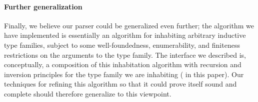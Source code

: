   \paragraph{Further generalization}
    Finally, we believe our parser could be generalized even further; the algorithm we have implemented is essentially an algorithm for inhabiting arbitrary inductive type families, subject to some well-foundedness, enumerability, and finiteness restrictions on the arguments to the type family.  The interface we described is, conceptually, a composition of this inhabitation algorithm with recursion and inversion principles for the type family we are inhabiting ( in this paper).  Our techniques for refining this algorithm so that it could prove itself sound and complete should therefore generalize to this viewpoint.
  
